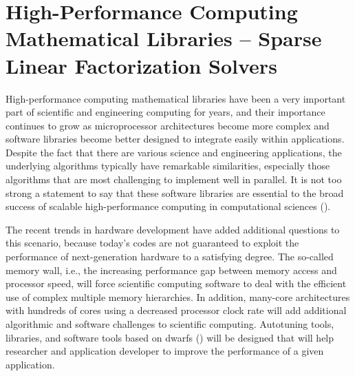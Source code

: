 
\section[Sparse Linear Factorization Solvers]{High-Performance Computing Mathematical Libraries -- Sparse Linear Factorization Solvers}
\label{sec:sparse-solvers}
High-performance  computing mathematical libraries have been a very important part of scientific and engineering computing for years, and their importance continues to grow as microprocessor architectures become more complex and software libraries become better designed to integrate easily within applications. Despite the fact that there are various science and engineering applications, the underlying algorithms typically have remarkable similarities, especially those algorithms that are most challenging to implement well in parallel. It is not too strong a statement to say that these software libraries are essential to the broad success of scalable high-performance computing in computational sciences (\cite{kothe-2007,pitac-2005,bader-2007}).

The recent trends in hardware development have added additional questions to this scenario, because today's codes are not guaranteed to exploit the performance of next-generation hardware to a satisfying degree. The so-called memory wall, i.e., the increasing performance gap between memory access and processor speed, will force scientific computing software to deal with the efficient use of complex multiple memory hierarchies. In addition, many-core architectures with hundreds of cores using a decreased processor clock rate will add additional algorithmic and software challenges to scientific computing. Autotuning tools, libraries, and software tools based on dwarfs (\cite{10.1145/1562764.1562783}) will be designed that will help researcher and application developer to improve the performance of a given application.

